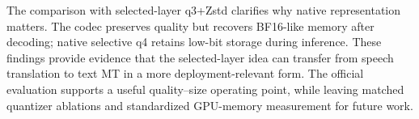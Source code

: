 \documentclass[11pt]{article}
\begin{document}
The comparison with selected-layer q3+Zstd clarifies why native representation matters. The codec preserves quality but recovers BF16-like memory after decoding; native selective q4 retains low-bit storage during inference. These findings provide evidence that the selected-layer idea can transfer from speech translation to text MT in a more deployment-relevant form. The official evaluation supports a useful quality--size operating point, while leaving matched quantizer ablations and standardized GPU-memory measurement for future work.


\end{document}
